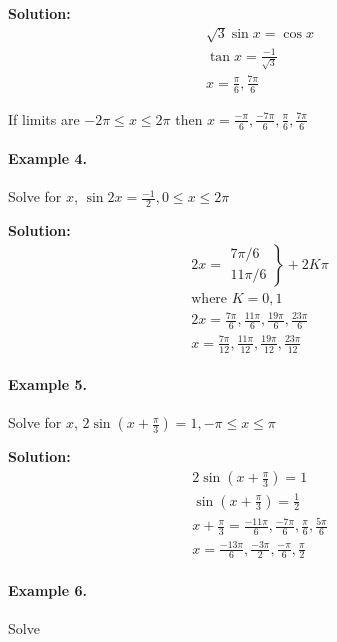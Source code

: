 \documentclass{article}
\begin{document}
{\scriptsize \textbf{Solution:}}
\[
  \begin{aligned}
    \sqrt{3}\sin x = \cos x \\
    \tan x = \frac{-1}{\sqrt{3}} \\
    x = \frac{\pi}{6}, \frac{7\pi}{6}
  \end{aligned}
\]

If limits are $-2\pi \leq x \leq 2\pi$ then $x = \frac{-\pi}{6}, \frac{-7\pi}{6}, \frac{\pi}{6}, \frac{7\pi}{6}$

\paragraph{Example 4.}
Solve for $x$, $\sin 2x = \frac{-1}{2}, 0 \leq x \leq 2\pi$

{\scriptsize \textbf{Solution:}}
\[
  \begin{aligned}
    2x =  \left. \begin{array}{c} 7\pi/6 \\ 11\pi/6 \end{array} \right\} + 2K\pi \\
    \text{where } K = 0, 1 \\
    2x = \frac{7\pi}{6}, \frac{11\pi}{6}, \frac{19\pi}{6}, \frac{23\pi}{6} \\
    x = \frac{7\pi}{12}, \frac{11\pi}{12}, \frac{19\pi}{12}, \frac{23\pi}{12}
  \end{aligned}
\]

\paragraph{Example 5.}
Solve for $x$, $2\sin\left( x + \frac{\pi}{3} \right) = 1, -\pi \leq x \leq \pi$

{\scriptsize \textbf{Solution:}}
\[
  \begin{aligned}
    2\sin\left( x + \frac{\pi}{3} \right) = 1 \\
    \sin\left( x + \frac{\pi}{3} \right) = \frac{1}{2} \\
    x + \frac{\pi}{3} = \frac{-11\pi}{6}, \frac{-7\pi}{6}, \frac{\pi}{6}, \frac{5\pi}{6} \\
    x = \frac{-13\pi}{6}, \frac{-3\pi}{2}, \frac{-\pi}{6}, \frac{\pi}{2}
  \end{aligned}
\]

\paragraph{Example 6.}
Solve
\end{document}
